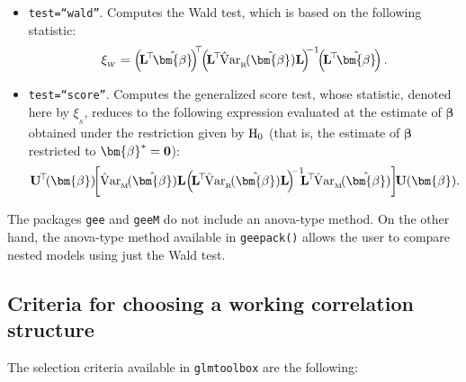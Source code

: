 \begin{itemize}
\item {\tt test=``wald''}. Computes the Wald test, which is based on the following statistic:
$$\xi_{_W}=\left(\!{\bf L}^{\!\top}\!\hat{\bm{\beta}}\!\right)^{\!\!\top}
\!\!\left(\!{\bf L}^{\!\top}\!{\rm \hat{V}ar}_{_{\rm R}}\!(\hat{\bm{\beta}}){\bf L}\!\right)^{\!\!-1}\!\!
\left(\!{\bf L}^{\!\top}\!\hat{\bm{\beta}}\!\right).$$

\item {\tt test=``score''}. Computes the generalized score test, whose statistic, denoted here by $\xi_{_S}$, reduces to the following expression evaluated at
the estimate of $\bm{\beta}$ obtained under the restriction given by ${\rm H}_0$ (that is, the estimate of $\bm{\beta}$ restricted to $\bm{\beta}^{*}={\bf 0}$):
$${\bf U}^{\!\top}\!(\bm{\beta})\!\!\left[{\rm \hat{V}ar}_{_{\rm M}}\!(\hat{\bm{\beta}}){\bf L}\!\left(\!{\bf L}^{\!\top}\!{\rm \hat{V}ar}_{_{\rm R}}\!(\hat{\bm{\beta}}){\bf L}\!\right)^{\!\!-1}\!\!
\!{\bf L}^{\!\top}\!{\rm \hat{V}ar}_{_{\rm M}}\!(\hat{\bm{\beta}})\right]\!\!{\bf U}(\bm{\beta}).$$

\end{itemize}

The packages {\tt gee} and {\tt geeM} do not include an anova-type method. On the other hand, the anova-type method available in {\tt geepack()} allows the user to compare nested models using just the Wald test.

\subsection{Criteria for choosing a working correlation structure}
The selection criteria available in {\tt glmtoolbox} are the following:

